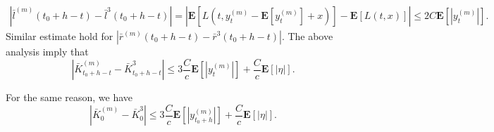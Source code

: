 \documentclass[10pt]{article}%
\numberwithin{equation}{section}
\def \E{\mathbf{E}}
\begin{document}
$$
\begin{aligned}
  \left|\bar{l}^{(m)}(t_0+h-t)-\bar{l}^{3}(t_0+h-t)\right|%
  = \left|\mathbf{E}\left[L(t,y^{(m)}_{t}-\E[y^{(m)}_{t}]+x)\right]-\mathbf{E}\left[L(t,x)\right]\right|
 \leq 2C\E\left[\left|y_{t}^{(m)}\right|\right].
\end{aligned}
$$
Similar estimate hold for $\left|\bar{r}^{(m)}(t_0+h-t)-\bar{r}^{3}(t_0+h-t)\right|$. The above analysis imply that 
\begin{equation}\label{t_0+h-t}
\left|\bar{K}^{(m)}_{t_0+h-t}-\bar{K}^{3}_{t_0+h-t}\right|\leq 3\frac{C}{c}\mathbf{E}\left[\left|y^{(m)}_{t}\right|\right]+\frac{C}{c}\mathbf{E}\left[\left|\eta\right|\right].    
\end{equation}

For the same reason, we have %
\begin{equation}\label{0}
 \left|\bar{K}^{(m)}_{0}-\bar{K}^{3}_{0}\right|\leq 3\frac{C}{c}\mathbf{E}\left[\left|y^{(m)}_{t_0+h}\right|\right]+\frac{C}{c}\mathbf{E}\left[\left|\eta\right|\right].   
\end{equation}
\end{document}
